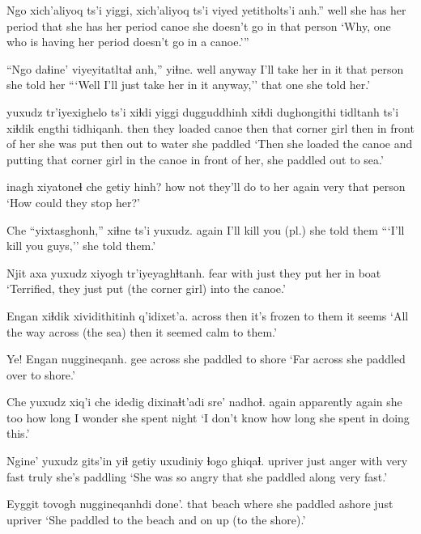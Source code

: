 \documentclass[12pt]{article}
\begin{document}
\gll Ngo xich'aliyoq ts'i yiggi, xich'aliyoq ts'i viyed {yetitholts'i} anh.''
well {she has her period} {} that {she has her period} {} canoe {she doesn't go in} {that person}
\glt `Why, one who is having her period doesn't go in a canoe.'''
\glend

\gll ``Ngo daɬine' viyeyitatltaɬ anh,'' yiɬne.
well anyway {I'll take her in it} {that person} {she told her}
\glt ```Well I'll just take her in it anyway,'' that one she told her.'
\glend

 yuxudz tr'iyexighelo ts'i xiɬdi yiggi dugguddhinh xiɬdi dughongithi tidltanh ts'i xiɬdik engthi tidhiqanh. 
then {} {they loaded canoe} then that {corner girl} {} then {in front of her} {she was put} {} then {out to water} {she paddled}
\glt `Then she loaded the canoe and putting that corner girl in the canoe in front of her, she paddled out to sea.' 
\glend

 inagh xiyatoneɬ che getiy hinh?
how          not  {they'll do to her} again very {that person}
\glt `How could they stop her?' 
\glend

\gll Che ``yixtasghonh,'' xiɬne ts'i yuxudz. 
again {I'll kill you (pl.)} {she told them}
\glt ```I'll kill you guys,'' she told them.' 
\glend

\gll Njit axa yuxudz {xiyogh tr'iyeyaghɬtanh.} 
fear with just {they put her in boat}
\glt `Terrified, they just put (the corner girl) into the canoe.'
\glend

\gll Engan xiɬdik xividithitinh q'idixet'a.
across then  {it's frozen to them} {it seems}
\glt `All the way across (the sea) then it seemed calm to them.' 
\glend

\gll Ye! Engan nuggineqanh. 
gee across {she paddled to shore}
\glt `Far across she paddled over to shore.' 
\glend

\gll Che yuxudz xiq'i che idedig dixinaɬt'adi sre' nadhoɬ. 
again {} {apparently} again {she too} {how long} {I wonder} {she spent night}
\glt `I don't know how long she spent in doing this.' 
\glend

\gll Ngine' yuxudz gits'in yiɬ getiy uxudiniy ɬogo ghiqaɬ. 
upriver just anger with very fast truly {she's paddling}
\glt `She was so angry that she paddled along very fast.' 
\glend

\gll Eyggit tovogh nuggineqanhdi done'.  
that beach {where she paddled ashore} {just upriver}
\glt `She paddled to the beach and on up (to the shore).'
\glend
 
\end{document}
